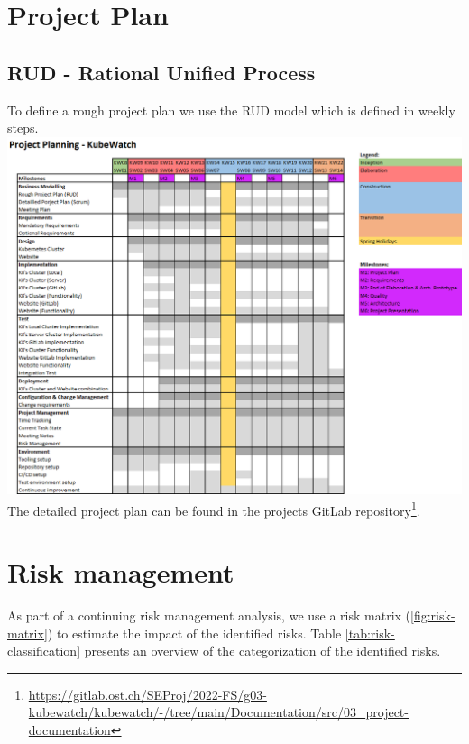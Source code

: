 \section{Project Plan}
\subsection{RUD - Rational Unified Process}
To define a rough project plan we use the RUD model which is defined in weekly steps. \newline
\includegraphics[width=\textwidth]{resources/project-plan-RUD.png}
\newline
The detailed project plan can be found in the projects GitLab repository\footnote{\url{https://gitlab.ost.ch/SEProj/2022-FS/g03-kubewatch/kubewatch/-/tree/main/Documentation/src/03_project-documentation}}.

\newpage
\section{Risk management}

As part of a continuing risk management analysis, we use a risk matrix (\ref{fig:risk-matrix}) to estimate the impact of the identified risks.\newline
Table \ref{tab:risk-classification} presents an overview of the categorization of the identified risks.

